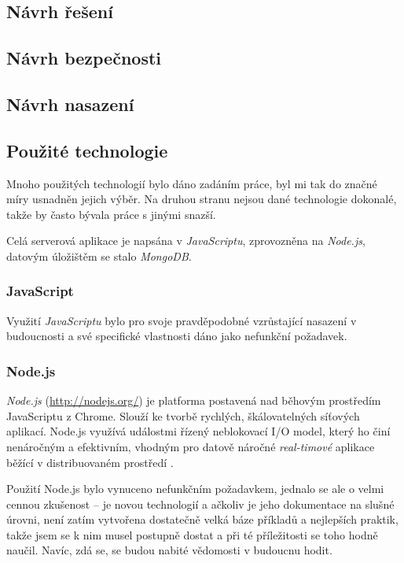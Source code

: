 \subsection{Návrh řešení}


\subsection{Návrh bezpečnosti}

\subsection{Návrh nasazení}

\subsection{Použité technologie}
Mnoho použitých technologií bylo dáno zadáním práce, byl mi tak do značné míry usnadněn jejich výběr. Na druhou stranu nejsou dané technologie dokonalé, takže by často bývala práce s jinými snazší.

Celá serverová aplikace je napsána v \emph{JavaScriptu}, zprovozněna na \emph{Node.js}, datovým úložištěm se stalo \emph{MongoDB}.

\subsubsection{JavaScript}
Využití \emph{JavaScriptu} bylo pro svoje pravděpodobné vzrůstající nasazení v budoucnosti a své specifické vlastnosti dáno jako nefunkční požadavek.

\subsubsection{Node.js}
\emph{Node.js} (\url{http://nodejs.org/}) je platforma postavená nad běhovým prostředím JavaScriptu z Chrome. Slouží ke tvorbě rychlých, škálovatelných síťových aplikací. Node.js využívá událostmi řízený neblokovací I/O model, který ho činí nenáročným a efektivním, vhodným pro datově náročné \textit{real-timové} aplikace běžící v distribuovaném prostředí \cite{Node}.

Použití Node.js bylo vynuceno nefunkčním požadavkem, jednalo se ale o velmi cennou zkušenost -- je novou technologií a ačkoliv je jeho dokumentace na slušné úrovni, není zatím vytvořena dostatečně velká báze příkladů a nejlepších praktik, takže jsem se k nim musel postupně dostat a při té příležitosti se toho hodně naučil. Navíc, zdá se, se budou nabité vědomosti v budoucnu hodit.

